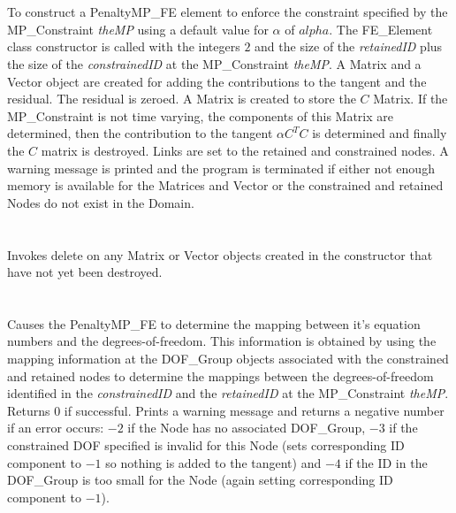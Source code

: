   \\
\\
To construct a PenaltyMP\_FE element to enforce the constraint
specified by the MP\_Constraint {\em theMP} using a default value for
$\alpha$ of $alpha$. The FE\_Element class constructor is called with
the integers $2$ and the size of the {\em retainedID} plus the size of
the {\em constrainedID} at the MP\_Constraint {\em theMP}. A Matrix
and a Vector object are created for adding the contributions to the
tangent and the residual. The residual is zeroed. A Matrix is created
to store the $C$ Matrix. If the MP\_Constraint is not time varying,
the components of this Matrix are determined, then the contribution
to the tangent $\alpha C^TC$ is determined and finally the $C$ matrix
is destroyed. Links are set to the retained and constrained nodes.
A warning message is printed and the program is terminated if
either not enough memory is available for the Matrices and Vector or the
constrained and retained Nodes do not exist in the Domain.  \\


  \\
  \\
Invokes delete on any Matrix or Vector objects created in the
constructor that have not yet been destroyed. \\

  \\
 \\
Causes the PenaltyMP\_FE to determine the mapping between it's equation
numbers and the degrees-of-freedom. This information is obtained by
using the mapping information at the DOF\_Group objects associated with
the constrained and retained nodes to determine the mappings between
the degrees-of-freedom identified in the {\em constrainedID} and the
{\em retainedID} at the MP\_Constraint {\em theMP}. Returns $0$ if
successful. Prints a warning message and returns a negative number if
an error occurs: $-2$ if the
Node has no associated DOF\_Group, $-3$ if the constrained DOF
specified is invalid for this Node (sets corresponding ID component to
$-1$ so nothing is added to the tangent) and $-4$ if the ID in the
DOF\_Group is too small for the Node (again setting corresponding ID
component to $-1$). \\ 


